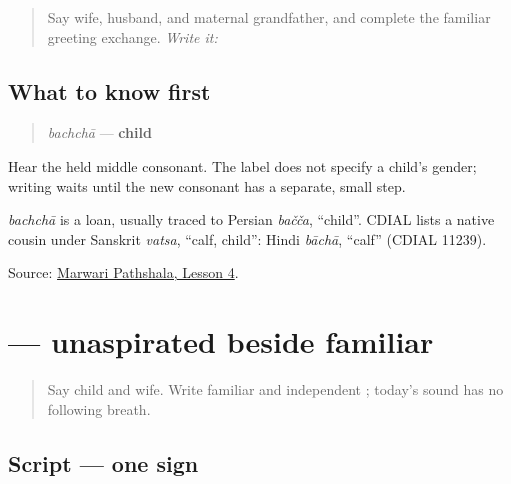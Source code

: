 \label{lesson:MW-C09-hear-bachcha}



\begin{quote}
Say wife, husband, and maternal grandfather, and complete the familiar greeting exchange. \emph{Write it:} \textbf{}
\end{quote}

\subsection*{What to know first}
\begin{quote}
\emph{bachchā} — \textbf{child}
\end{quote}

Hear the held middle consonant. The label does not specify a child's gender; writing waits until the new consonant has a separate, small step.

\begin{cousinweb}
\emph{bachchā} is a loan, usually traced to Persian \emph{bačča}, \textquotedblleft{}child\textquotedblright{}. CDIAL lists a native cousin under Sanskrit \emph{vatsa}, \textquotedblleft{}calf, child\textquotedblright{}: Hindi \emph{bāchā}, \textquotedblleft{}calf\textquotedblright{} (CDIAL 11239).
\end{cousinweb}

\begin{tcolorbox}[breakable,colback=teal!4,colframe=teal!35!black,title={Before you move on}]
Source: \href{https://www.marwaripathshala.com/marwari-lesson-4-english}{Marwari Pathshala, Lesson 4}.
\end{tcolorbox}
\section[\texorpdfstring{\mw{च} (cha)}{च (cha)}]{ — unaspirated beside familiar }

\label{lesson:MW-W09-cha}



\begin{quote}
Say child and wife. Write familiar \textbf{} and independent \textbf{}; today's sound has no following breath.
\end{quote}

\subsection*{Script — one sign}

